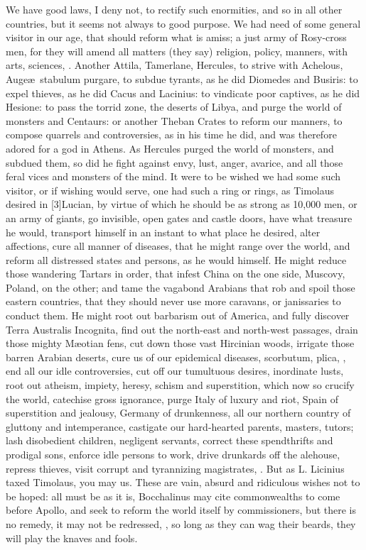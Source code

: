 {We have good laws, I deny not, to rectify such enormities, and so in
all other countries, but it seems not always to good purpose. We had
need of some general visitor in our age, that should reform what is
amiss; a just army of Rosy-cross men, for they will amend all matters
(they say) religion, policy, manners, with arts, sciences, \etc{}. Another
Attila, Tamerlane, Hercules, to strive with Achelous, Auge\ae{}\ stabulum
purgare, to subdue tyrants, as he did Diomedes and Busiris: to
expel thieves, as he did Cacus and Lacinius: to vindicate poor
captives, as he did Hesione: to pass the torrid zone, the deserts of
Libya, and purge the world of monsters and Centaurs: or another Theban
Crates to reform our manners, to compose quarrels and controversies, as
in his time he did, and was therefore adored for a god in Athens. As
Hercules purged the world of monsters, and subdued them, so did he
fight against envy, lust, anger, avarice, \etc{} and all those feral vices
and monsters of the mind. It were to be wished we had some such
visitor, or if wishing would serve, one had such a ring or rings, as
Timolaus desired in [3\baselineskip]Lucian, by virtue of which he should be as
strong as 10,000 men, or an army of giants, go invisible, open gates
and castle doors, have what treasure he would, transport himself in an
instant to what place he desired, alter affections, cure all manner of
diseases, that he might range over the world, and reform all distressed
states and persons, as he would himself. He might reduce those
wandering Tartars in order, that infest China on the one side, Muscovy,
Poland, on the other; and tame the vagabond Arabians that rob and spoil
those eastern countries, that they should never use more caravans, or
janissaries to conduct them. He might root out barbarism out of
America, and fully discover Terra Australis Incognita, find out the
north-east and north-west passages, drain those mighty M\ae{}otian fens,
cut down those vast Hircinian woods, irrigate those barren Arabian
deserts, \etc{} cure us of our epidemical diseases, scorbutum, plica,
, \etc{} end all our idle controversies, cut off our
tumultuous desires, inordinate lusts, root out atheism, impiety,
heresy, schism and superstition, which now so crucify the world,
catechise gross ignorance, purge Italy of luxury and riot, Spain of
superstition and jealousy, Germany of drunkenness, all our northern
country of gluttony and intemperance, castigate our hard-hearted
parents, masters, tutors; lash disobedient children, negligent
servants, correct these spendthrifts and prodigal sons, enforce idle
persons to work, drive drunkards off the alehouse, repress thieves,
visit corrupt and tyrannizing magistrates, \etc{}. But as L. Licinius taxed
Timolaus, you may us. These are vain, absurd and ridiculous wishes not
to be hoped: all must be as it is, Bocchalinus may cite
commonwealths to come before Apollo, and seek to reform the world
itself by commissioners, but there is no remedy, it may not be
redressed, ,
so long as they can wag their beards, they will play the knaves and
fools.

}

